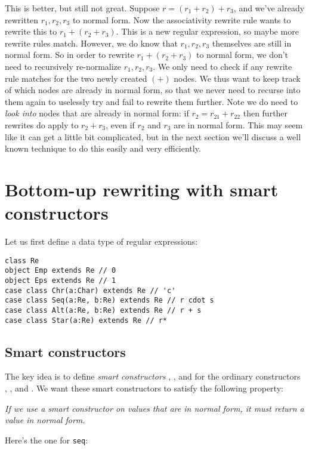 This is better, but still not great. Suppose $r = (r_1 + r_2) + r_3$, and we've already rewritten $r_1,r_2,r_3$ to normal form. Now the associativity rewrite rule wants to rewrite this to $r_1 + (r_2 + r_3)$. This is a new regular expression, so maybe more rewrite rules match. However, we do know that $r_1, r_2, r_3$ themselves are still in normal form. So in order to rewrite $r_1 + (r_2 + r_3)$ to normal form, we don't need to recursively re-normalize $r_1, r_2, r_3$. We only need to check if any rewrite rule matches for the two newly created $(+)$ nodes. We thus want to keep track of which nodes are already in normal form, so that we never need to recurse into them again to uselessly try and fail to rewrite them further. Note we do need to \emph{look into} nodes that are already in normal form: if $r_2 = r_{21} + r_{22}$ then further rewrites do apply to $r_2 + r_3$, even if $r_2$ and $r_3$ are in normal form. This may seem like it can get a little bit complicated, but in the next section we'll discuss a well known technique to do this easily and very efficiently.



\section{Bottom-up rewriting with smart constructors}

Let us first define a data type of regular expressions:

\begin{lstlisting}
class Re
object Emp extends Re // 0
object Eps extends Re // 1
case class Chr(a:Char) extends Re // 'c'
case class Seq(a:Re, b:Re) extends Re // r cdot s
case class Alt(a:Re, b:Re) extends Re // r + s
case class Star(a:Re) extends Re // r*
\end{lstlisting}

\subsection{Smart constructors}

The key idea is to define \emph{smart constructors} , , and  for the ordinary constructors , , and . We want these smart constructors to satisfy the following property:

\emph{If we use a smart constructor on values that are in normal form, it must return a value in normal form.}

Here's the one for \lstinline|seq|:

